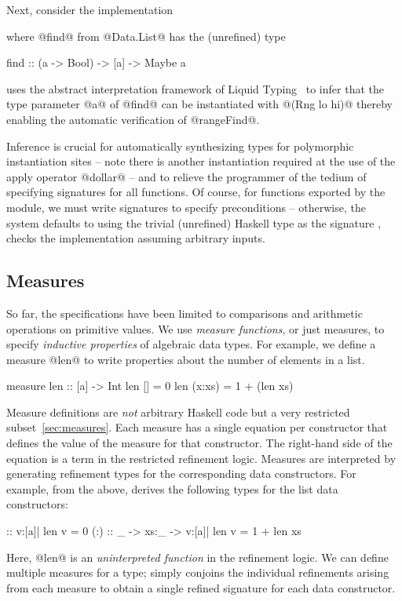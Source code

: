  Next, consider the implementation
%
where @find@ from @Data.List@ has the (unrefined) type
%
\begin{code}
  find :: (a -> Bool) -> [a] -> Maybe a
\end{code}
%
\toolname uses the abstract interpretation framework of 
Liquid Typing~\cite{LiquidPLDI08} to infer that the type
parameter @a@ of @find@ can be instantiated with @(Rng lo hi)@
thereby enabling the automatic verification of @rangeFind@.

Inference is crucial for automatically synthesizing types
for polymorphic instantiation sites -- note there is another
instantiation required at the use of the apply operator 
@dollar@ --  and to relieve the programmer of the tedium of %
specifying signatures for all functions. 
%
Of course, for functions exported by the module,
we must write signatures to specify preconditions -- otherwise, 
the system defaults to using the trivial (unrefined) Haskell 
type as the signature \ie, checks the implementation assuming 
arbitrary inputs.

\subsection{Measures}\label{sec:tool:measures}
So far, the specifications have been limited to comparisons and 
arithmetic operations on primitive values. 
We use \emph{measure functions}, or just measures, to 
specify \emph{inductive properties} of algebraic data types. 
%
For example, we define a measure @len@ to write properties about the number
of elements in a list.
%
\begin{code}
  measure len :: [a] -> Int
  len []      = 0
  len (x:xs)  = 1 + (len xs)
\end{code}
%
Measure definitions are \emph{not} arbitrary Haskell code but a very 
restricted subset~\ref{sec:measures}.
Each measure has a single equation per constructor that defines the
value of the measure for that constructor. The right-hand side of the 
equation is a term in the restricted refinement logic. Measures are 
interpreted by generating refinement types for the corresponding 
data constructors.
%
For example, from the above, \toolname derives the 
following types for the list data constructors:
%
\begin{code}
  []  :: {v:[a]| len v = 0}
  (:) :: _ -> xs:_ -> {v:[a]| len v = 1 + len xs}
\end{code}
%
Here, @len@ is an \emph{uninterpreted function} in the refinement logic.
We can define multiple measures for a type; \toolname simply conjoins
the individual refinements arising from each measure to obtain a single
refined signature for each data constructor.

